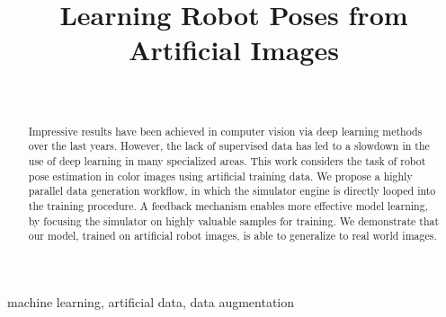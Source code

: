 \documentclass[conference]{IEEEtran}
\begin{document}
\title{Learning Robot Poses from Artificial Images\\
}

\author{
    \\
}


\maketitle

\begin{abstract}
    Impressive results have been achieved in computer vision via deep learning methods over the last years. However, the lack of supervised data has led to a slowdown in the use of deep learning in many specialized areas. This work considers the task of robot pose estimation in color images using artificial training data. We propose a highly parallel data generation workflow, in which the simulator engine is directly looped into the training procedure. A feedback mechanism enables more effective model learning, by focusing the simulator on highly valuable samples for training. We demonstrate that our model, trained on artificial robot images, is able to generalize to real world images. 
\end{abstract}

\begin{IEEEkeywords}
machine learning, artificial data, data augmentation
\end{IEEEkeywords}
\end{document}
